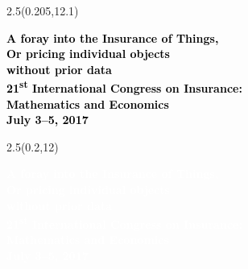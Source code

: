 \begin{frame}[plain]
  \begin{textblock*}{2.5\TPHorizModule}(0.205\TPHorizModule,12.1\TPVertModule)
    \raggedright%
    \bfseries
    \fontsize{20}{20}\selectfont
    \textcolor{black}{%
      A foray into the Insurance of Things, \\
      Or pricing individual objects \\
      without prior data} \\
    \mdseries
    \fontsize{12}{13}\selectfont
    \textcolor{black}{%
      21\textsuperscript{st} International Congress on
      Insurance: \\ Mathematics and Economics \\
      July 3--5, 2017}
  \end{textblock*}
  \begin{textblock*}{2.5\TPHorizModule}(0.2\TPHorizModule,12\TPVertModule)
    \raggedright%
    \bfseries
    \fontsize{20}{20}\selectfont
    \textcolor{white}{%
      A foray into the Insurance of Things, \\
      Or pricing individual objects \\
      without prior data} \\
    \mdseries
    \fontsize{12}{14}\selectfont
    \textcolor{white}{%
      21\textsuperscript{st} International Congress on
      Insurance: \\ Mathematics and Economics \\
      July 3--5, 2017}
  \end{textblock*}
\end{frame}
\endgroup

